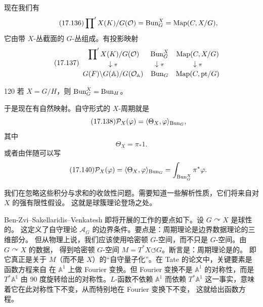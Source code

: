 现在我们有
\begin{equation}\tag{17.136}\label{eq:17.136}
\sideset{}{'}\prod X(K)/G(\mathcal{O})=\mathrm{Bun}^X_G=\operatorname{Map}(C,X/G),
\end{equation}
它由带 $X$-丛截面的 $G$-丛组成。有投影映射
\begin{equation}\tag{17.137}\label{eq:17.137}
\begin{array}{ccc}
\sideset{}{'}\prod X(K)/G(\mathcal{O}) & \mathrm{Bun}^X_G & \operatorname{Map}(C,X/G)\\[2pt]
\downarrow{\scriptstyle\pi} & \downarrow{\scriptstyle\pi}
& \downarrow{\scriptstyle\pi}\\[2pt]
G(F)\backslash G(\mathbb A)/G(\mathcal{O}_{\mathbb A}) & \mathrm{Bun}_G
& \operatorname{Map}(C,\mathrm{pt}/G)
\end{array}
\end{equation}

\begin{srcex}{120}
若 $X=G/H$，则 $\mathrm{Bun}^X_G=\mathrm{Bun}_H$。
\end{srcex}

于是现在有自然映射。自守形式的 $X$-周期就是
\begin{equation}\tag{17.138}\label{eq:17.138}
\mathcal{P}_X(\varphi)=\langle\Theta_X,\varphi\rangle_{\mathrm{Bun}_G},
\end{equation}
其中
\begin{equation}\tag{17.139}\label{eq:17.139}
\Theta_X=\pi_*1.
\end{equation}
或者由伴随可以写
\begin{equation}\tag{17.140}\label{eq:17.140}
\mathcal{P}_X(\varphi)=\langle\Theta_X,\varphi\rangle_{\mathrm{Bun}_G}
=\int_{\mathrm{Bun}^X_G}\pi^*\varphi.
\end{equation}

我们在忽略这些积分与求和的收敛性问题。需要知道一些解析性质，它们将来自对 $X$ 的强有限性假设。
这就是球簇理论登场之处。

Ben-Zvi--Sakellaridis--Venkatesh 即将开展的工作的要点如下。设 $G\curvearrowright X$ 是球性的。
这定义了自守理论 $\mathcal A_G$ 的边界条件。要点是：周期理论是边界数据理论的三维部分。
但从物理上说，我们应该使用哈密顿 $G$-空间，而不只是 $G$-空间。由 $G\curvearrowright X$ 的数据，
得到哈密顿 $G$-空间 $M=T^*X\circlearrowleft G$。断言是：周期理论是的。
即它真正是关于 $M$（而不是 $X$）的“自守量子化”。在 Tate 的论文中，关键要素是函数方程来自
在 $\mathbb A^1$ 上做 Fourier 变换。但 Fourier 变换不是 $\mathbb A^1$ 的对称性，而是
$T^*\mathbb A^1$ 由 90 度旋转给出的对称性。$L$-函数不依赖 $\mathbb A^1$ 而依赖
$T^*\mathbb A^1$ 这一事实，意味着它在此对称性下不变，从而特别地在 Fourier 变换下不变，
这就给出函数方程。

